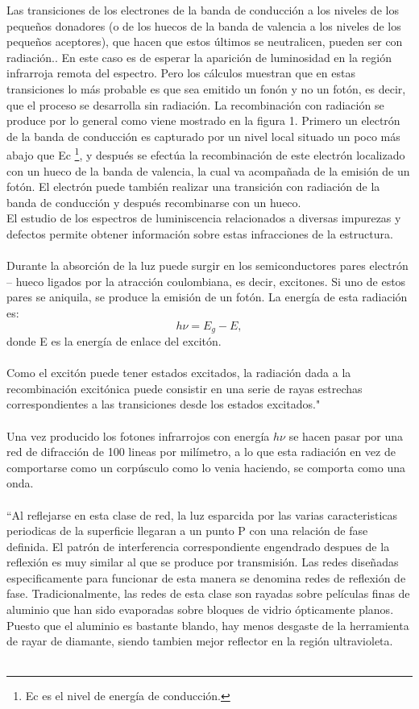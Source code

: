 \documentclass[12]{article}
\begin{document}
\begin{multicols}{2}
Las transiciones de los electrones de la banda de conducción a los niveles de los pequeños donadores (o de los huecos de la banda de valencia a los niveles de los pequeños aceptores),  que hacen que estos últimos se neutralicen, pueden ser con radiación.. En este caso es de esperar la aparición de luminosidad en la región infrarroja remota del espectro. Pero los cálculos  muestran que en estas transiciones lo más probable es que sea emitido un fonón y no un fotón, es decir, que el proceso se desarrolla sin radiación. La recombinación con radiación se produce por lo general  como viene mostrado en la figura 1. Primero un electrón de la banda de conducción es capturado por un nivel local situado un poco más abajo que Ec  \footnote{Ec es el nivel de energía de conducción.}, y después se efectúa la recombinación de este electrón localizado con un hueco de la banda de valencia, la cual va acompañada de la emisión de un fotón. El electrón puede también realizar una transición con radiación de la banda de conducción y después recombinarse con un hueco. \\ 
El estudio de los espectros de luminiscencia relacionados a diversas impurezas y defectos permite obtener información sobre estas infracciones de la estructura. \\ \\
Durante la absorción de la luz puede surgir en los semiconductores pares electrón – hueco ligados por la atracción coulombiana, es decir, excitones. Si uno de estos pares se aniquila, se produce la emisión de un fotón. La energía de esta radiación es: 
\begin{equation}
h\nu = E_g - E,
\end{equation}
donde E es la energía de enlace del excitón. \\ \\
Como el excitón puede tener estados excitados, la radiación dada a la recombinación excitónica puede consistir en una serie de rayas estrechas correspondientes a las transiciones desde los estados excitados." \cite{SEMICONDUCTOR} \\ \\
Una vez producido los fotones infrarrojos con energía $h\nu$ se hacen pasar por una red de difracción de 100 lineas por milímetro, a lo que esta radiación en vez de comportarse como un corpúsculo como lo venia haciendo, se comporta como una onda.
\\ \\
``Al reflejarse en esta clase de red, la luz esparcida por las varias caracteristicas periodicas de la superficie llegaran a un punto P con una relación de fase definida. El patrón de interferencia correspondiente engendrado despues de la reflexión es muy similar al que se produce por transmisión. Las redes diseñadas especificamente para funcionar de esta manera se denomina redes de reflexión de fase. Tradicionalmente, las redes de esta clase son rayadas sobre películas finas de aluminio que han sido evaporadas sobre bloques de vidrio ópticamente planos. Puesto que el aluminio es bastante blando, hay menos desgaste de la herramienta de rayar de diamante, siendo tambien mejor reflector en la región ultravioleta. \\ \\

\end{multicols}
\end{document}
